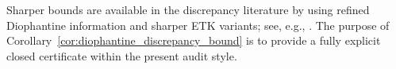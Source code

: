 \begin{remark}
Sharper bounds are available in the discrepancy literature by using refined Diophantine information and sharper ETK variants; see, e.g., \cite{KuipersNiederreiter1974,DrmotaTichy1997,Niederreiter1992,DickPillichshammer2010}. The purpose of Corollary~\ref{cor:diophantine_discrepancy_bound} is to provide a fully explicit closed certificate within the present audit style.
\end{remark}


